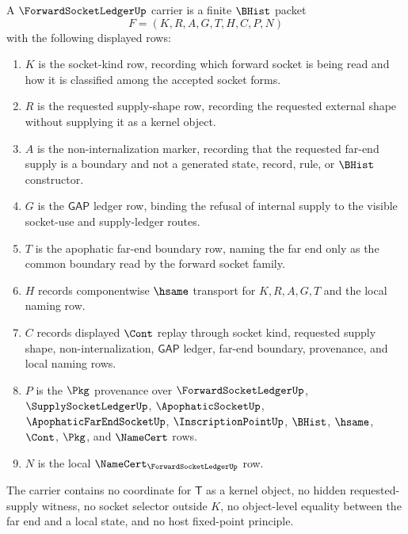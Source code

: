 \begin{definition}
\label{def:forward-socket-ledger-carrier}
A $\ForwardSocketLedgerUp$ carrier is a finite $\BHist$ packet
$$
F=(K,R,A,G,T,H,C,P,N)
$$
with the following displayed rows:
\begin{enumerate}
\item $K$ is the socket-kind row, recording which forward socket is being read and how it is classified among the accepted socket forms.
\item $R$ is the requested supply-shape row, recording the requested external shape without supplying it as a kernel object.
\item $A$ is the non-internalization marker, recording that the requested far-end supply is a boundary and not a generated state, record, rule, or $\BHist$ constructor.
\item $G$ is the $\mathsf{GAP}$ ledger row, binding the refusal of internal supply to the visible socket-use and supply-ledger routes.
\item $T$ is the apophatic far-end boundary row, naming the far end only as the common boundary read by the forward socket family.
\item $H$ records componentwise $\hsame$ transport for $K,R,A,G,T$ and the local naming row.
\item $C$ records displayed $\Cont$ replay through socket kind, requested supply shape, non-internalization, $\mathsf{GAP}$ ledger, far-end boundary, provenance, and local naming rows.
\item $P$ is the $\Pkg$ provenance over $\ForwardSocketLedgerUp$, $\SupplySocketLedgerUp$, $\ApophaticSocketUp$, $\ApophaticFarEndSocketUp$, $\InscriptionPointUp$, $\BHist$, $\hsame$, $\Cont$, $\Pkg$, and $\NameCert$ rows.
\item $N$ is the local $\NameCert_{\ForwardSocketLedgerUp}$ row.
\end{enumerate}
The carrier contains no coordinate for $\mathsf{T}$ as a kernel object, no hidden requested-supply witness, no socket selector outside $K$, no object-level equality between the far end and a local state, and no host fixed-point principle.
\end{definition}

